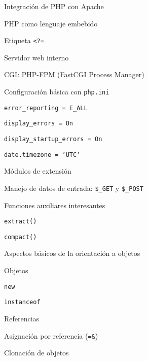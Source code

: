 \begin{longenum}
\begin{longenum}
\begin{longenum}
\begin{longenum}
                \item Integración de PHP con Apache
                \item PHP como lenguaje embebido
                \item Etiqueta \texttt{<?=}
                \item Servidor web  interno
            \end{longenum}
            \item CGI: PHP-FPM (FastCGI Process Manager)
            \item Configuración básica con \texttt{php.ini}
            \begin{longenum}
                \item \texttt{error\_reporting = E\_ALL}
                \item \texttt{display\_errors = On}
                \item \texttt{display\_startup\_errors = On}
                \item \texttt{date.timezone = 'UTC'}
            \end{longenum}
            \item Módulos de extensión
        \end{longenum}
        \item Manejo de datos de entrada: \texttt{\$\_GET} y \texttt{\$\_POST}
        \item Funciones auxiliares interesantes
        \begin{longenum}
            \item \texttt{extract()}
            \item \texttt{compact()}
        \end{longenum}
        \item Aspectos básicos de la orientación a objetos
        \begin{longenum}
            \item Objetos
            \begin{longenum}
                \item \texttt{new}
                \item \texttt{instanceof}
            \end{longenum}
            \item Referencias
            \begin{longenum}
                \item Asignación por referencia (\texttt{=\&})
            \end{longenum}
            \item Clonación de objetos

\end{longenum}
\end{longenum}
\end{longenum}
